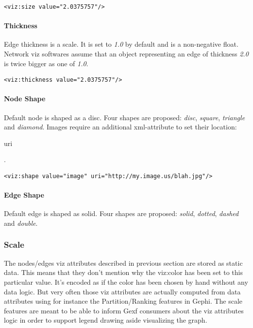 \documentclass[a4paper,10pt]{article}
\begin{document}
\lstset{ style=gexf }
\begin{lstlisting}[caption={VIZ Size Declaration},label=vizsize]
<viz:size value="2.0375757"/>
\end{lstlisting}

\paragraph{Thickness}

Edge thickness is a scale. It is set to \textit{1.0} by default and is a non-negative float. Network viz softwares assume that an object representing an edge of thickness \textit{2.0} is twice bigger as one of \textit{1.0}.

\lstset{ style=gexf }
\begin{lstlisting}[caption={VIZ Thickness Declaration},label=vizthickness]
<viz:thickness value="2.0375757"/>
\end{lstlisting}

\paragraph{Node Shape}

Default node is shaped as a disc. Four shapes are proposed: \textit{disc}, \textit{square}, \textit{triangle} and \textit{diamond}. Images require an additional xml-attribute to set their location: \begin{footnotesize}uri\end{footnotesize}.

\lstset{ style=gexf }
\begin{lstlisting}[caption={Image Declaration},label=vizimage]
<viz:shape value="image" uri="http://my.image.us/blah.jpg"/>
\end{lstlisting}

\paragraph{Edge Shape}

Default edge is shaped as solid. Four shapes are proposed: \textit{solid}, \textit{dotted}, \textit{dashed} and \textit{double}.

\subsubsection{Scale}

The nodes/edges viz attributes described in previous section are stored as static data. This means that they don't mention why the viz:color has been set to this particular value. It's encoded as if the color has been chosen by hand without any data logic. But very often those viz attributes are actually computed from data attributes using for instance the Partition/Ranking features in Gephi.
The scale features are meant to be able to inform Gexf consumers about the viz attributes logic in order to support legend drawing aside visualizing the graph.
\end{document}
